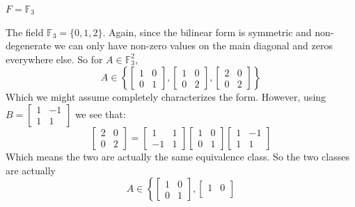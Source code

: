 \documentclass[11pt]{article}
\newcommand{\F}{\mathbb{F}}
\begin{document}
\begin{problem}
\begin{parts}
  \item $F = \mathbb{F}_3$
    \begin{solution}
      The field \( \F_3=\{0, 1, 2\} \). Again, since the bilinear
      form is symmetric and non-degenerate we can only have non-zero
      values on the main diagonal and zeros everywhere else. So for
      \( A\in\F_3^2 \),
      \[
        A\in\left\{
          \begin{bmatrix}
            1 & 0 \\
            0 & 1
          \end{bmatrix},
          \begin{bmatrix}
            1 & 0 \\
            0 & 2
          \end{bmatrix},
          \begin{bmatrix}
            2 & 0 \\
            0 & 2
          \end{bmatrix}
        \right\}
      \]
      Which we might assume completely characterizes the form.
      However, using \( B=
        \begin{bmatrix}1 & -1 \\ 1 & 1
      \end{bmatrix}\) we see that:
      \[
        \begin{bmatrix}
          2 & 0 \\
          0 & 2
        \end{bmatrix} =
        \begin{bmatrix}
          1 & 1 \\ -1 & 1
        \end{bmatrix}
        \begin{bmatrix}
          1 & 0 \\
          0 & 1
        \end{bmatrix}
        \begin{bmatrix}
          1 & -1 \\
          1 & 1
        \end{bmatrix}
      \]
      Which means the two are actually the same equivalence class. So
      the two classes are actually
      \[
        A\in\left\{
          \begin{bmatrix}
            1 & 0 \\
            0 & 1
          \end{bmatrix},
          \begin{bmatrix}
            1 & 0 \\

\end{bmatrix}\]
\end{solution}
\end{parts}
\end{problem}
\end{document}
